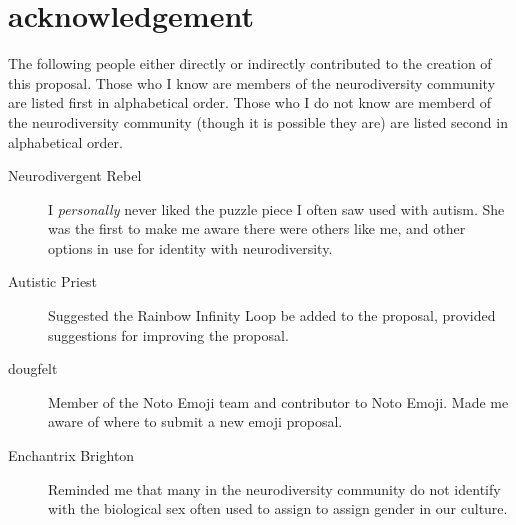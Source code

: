 \section{acknowledgement}

The following people either directly or indirectly contributed to the creation of this
proposal. Those who I know are members of the neurodiversity community are listed first
in alphabetical order. Those who I do not know are memberd of the neurodiversity community
(though it is possible they are) are listed second in alphabetical order.

\begin{description}
  \item[Neurodivergent Rebel] I \emph{personally} never liked the puzzle piece I often saw used with autism. She was the first to make me aware there were others like me, and other options in use for identity with neurodiversity.
  \item[Autistic Priest] Suggested the Rainbow Infinity Loop be added to the proposal, provided suggestions for improving the proposal.
  \item[dougfelt] Member of the Noto Emoji team and contributor to Noto Emoji. Made me aware of where to submit a new emoji proposal.
  \item[Enchantrix Brighton] Reminded me that many in the neurodiversity community do not identify with the biological sex often used to assign to assign gender in our culture.
\end{description}
